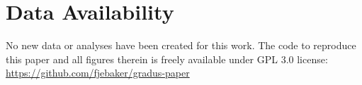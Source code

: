 \documentclass[fleqn,usenatbib]{mnras}
\begin{document}
\section*{Data Availability}

No new data or analyses have been created for this work. The code to reproduce
this paper and all figures therein is freely available under GPL 3.0 license:
\url{https://github.com/fjebaker/gradus-paper}










\appendix



% 

% 
% 




\bsp	%
\label{lastpage}
\end{document}
